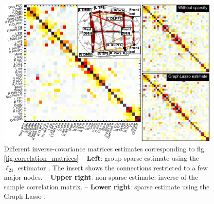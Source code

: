 \documentclass[5p]{elsarticle}
\begin{document}
\begin{figure}
\includegraphics[width=\linewidth]{pg_0003}%

\caption{
Different inverse-covariance matrices estimates corresponding to
fig.\,\ref{fig:correlation_matrices} -- \textbf{Left}: group-sparse estimate
using the $\ell_{21}$ estimator \cite{varoquaux2010c}.
The insert shows the
connections restricted to a few major nodes. -- \textbf{Upper
right}: non-sparse estimate: inverse of the sample correlation matrix. --
\textbf{Lower right}: sparse estimate using the Graph Lasso
\cite{friedman2008}.
\label{fig:icov_estimators}
}
\end{figure}
\end{document}
